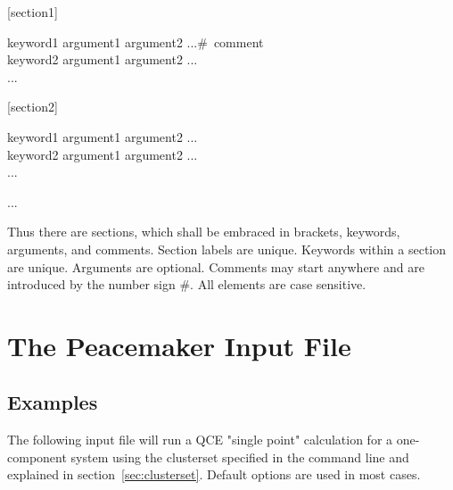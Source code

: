 \documentclass{scrartcl}
\begin{document}
\begin{addmargin}[1cm]{0cm}
    \ttfamily
    \begin{minipage}{\textwidth}
        [section1]
        \begin{addmargin}[1cm]{0cm}
            keyword1 argument1 argument2 ...\#\ comment \\
            keyword2 argument1 argument2 ...\\
            ...
        \end{addmargin}
    \end{minipage}

    \begin{minipage}{\textwidth}
        [section2]
        \begin{addmargin}[1cm]{0cm}
            keyword1 argument1 argument2 ... \\
            keyword2 argument1 argument2 ... \\
            ...
        \end{addmargin}
    \end{minipage}

    \begin{minipage}{\textwidth}
        ...
    \end{minipage}

\end{addmargin}

Thus there are sections, which shall be embraced in brackets, keywords, arguments, and comments.
Section labels are unique.
Keywords within a section are unique.
Arguments are optional.
Comments may start anywhere and are introduced by the number sign \#.
All elements are case sensitive.

\section{The Peacemaker Input File}
\label{sec:input}

\subsection{Examples}

The following input file will run a QCE "single point" calculation for a one-component system using the clusterset specified in the command line and explained in section~\vref{sec:clusterset}.
Default options are used in most cases.
\end{document}
